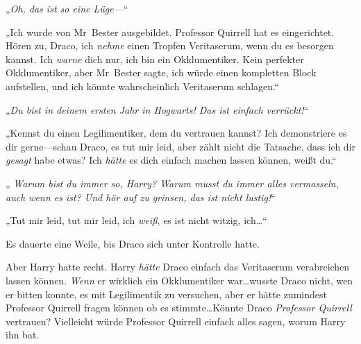 „\emph{Oh, das ist so eine Lüge—}“

„Ich wurde von Mr~Bester ausgebildet. Professor Quirrell hat es eingerichtet. Hören zu, Draco, ich \emph{nehme} einen Tropfen Veritaserum, wenn du es besorgen kannst. Ich \emph{warne} dich nur, ich bin ein Okklumentiker. Kein perfekter Okklumentiker, aber Mr~Bester sagte, ich würde einen kompletten Block aufstellen, und ich könnte wahrscheinlich Veritaserum schlagen.“

„\emph{Du bist in deinem ersten Jahr in Hogwarts! Das ist einfach verrückt!}“

„Kennst du einen Legilimentiker, dem du vertrauen kannst? Ich demonstriere es dir gerne—schau Draco, es tut mir leid, aber zählt nicht die Tatsache, dass ich dir \emph{gesagt} habe etwas? Ich \emph{hätte} es dich einfach machen lassen können, weißt du.“

„\emph{ Warum bist du immer so, Harry? Warum musst du immer alles vermasseln, auch wenn es  ist? Und hör auf zu grinsen, das ist nicht lustig!}“

„Tut mir leid, tut mir leid, ich \emph{weiß}, es ist nicht witzig, ich…“

Es dauerte eine Weile, bis Draco sich unter Kontrolle hatte.

Aber Harry hatte recht. Harry \emph{hätte} Draco einfach das Veritaserum verabreichen lassen können. \emph{Wenn} er wirklich ein Okklumentiker war…wusste Draco nicht, wen er bitten konnte, es mit Legilimentik zu versuchen, aber er hätte zumindest Professor Quirrell fragen können ob es stimmte…Könnte Draco \emph{Professor Quirrell} vertrauen? Vielleicht würde Professor Quirrell einfach alles sagen, worum Harry ihn bat.

